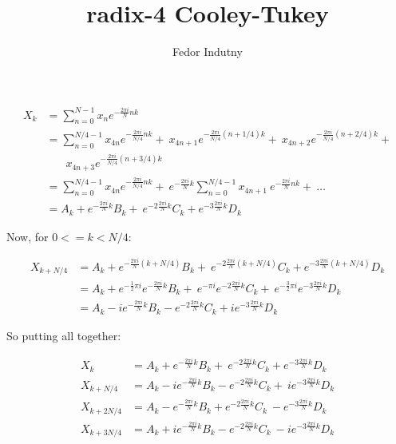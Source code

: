 \documentclass[11pt]{article}
\title{radix-4 Cooley-Tukey}
\author{Fedor Indutny}
\begin{document}
\maketitle

\begin{equation}
\begin{split}
X_k & = \sum^{N-1}_{n=0} x_n e^{-\frac{2 \pi i}{N} nk} \\
  & = \sum^{N/4 - 1}_{n=0} x_{4n} e^{-\frac{2 \pi i}{N/4} nk} + \
       x_{4n+1} e^{-\frac{2 \pi i}{N/4} (n+1/4) k} + \
       x_{4n+2} e^{-\frac{2 \pi i}{N/4} (n+2/4) k} + \\
  & \ \ \ \ \ \ \ \ x_{4n+3} e^{-\frac{2 \pi i}{N/4} (n+3/4) k} \\
  & = \sum^{N/4 - 1}_{n=0} x_{4n} e^{-\frac{2 \pi i}{N/4} nk} + \
        e^{-\frac{2 \pi i}{N}k} \sum^{N/4 - 1}_{n=0} x_{4n + 1} \
          e^{-\frac{2 \pi i}{N} nk} + \
        \dots \\
  & = A_k + e^{-\frac{2 \pi i}{N}k} B_k + \
        e^{-2 \frac{2 \pi i}{N}k} C_k + e^{-3 \frac{2 \pi i}{N}k} D_k
\end{split}
\end{equation}

Now, for $0 <= k < N/4$:

\begin{equation}
\begin{split}
X_{k + N/4} & = A_k + e^{-\frac{2 \pi i}{N}(k + N/4)} B_k + \
        e^{-2 \frac{2 \pi i}{N}(k + N/4)} C_k + e^{-3 \frac{2 \pi i}{N}(k+ N/4)} D_k \\
   & = A_k + e^{-\frac{1}{2} \pi i} e^{-\frac{2 \pi i}{N}k} B_k + \
         e^{-\pi i} e^{-2 \frac{2 \pi i}{N}k} C_k + \
         e^{-\frac{3}{2} \pi i} e^{-3 \frac{2 \pi i}{N}k} D_k \\
   & = A_k - i e^{-\frac{2 \pi i}{N}k} B_k - e^{-2 \frac{2 \pi i}{N}k} C_k + 
         i e^{-3 \frac{2 \pi i}{N}k} D_k
\end{split}
\end{equation}

So putting all together:

\begin{equation}
\begin{split}
X_k & = A_k + e^{-\frac{2 \pi i}{N}k} B_k + \
        e^{-2 \frac{2 \pi i}{N}k} C_k + e^{-3 \frac{2 \pi i}{N}k} D_k \\
X_{k + N/4} & = A_k - i e^{-\frac{2 \pi i}{N}k} B_k - e^{-2 \frac{2 \pi i}{N}k} C_k + \
         i e^{-3 \frac{2 \pi i}{N}k} D_k \\
X_{k + 2N/4} & = A_k - e^{-\frac{2 \pi i}{N}k} B_k + e^{-2 \frac{2 \pi i}{N}k} C_k \
  -e^{-3 \frac{2 \pi i}{N}k} D_k \\
X_{k + 3N/4} & = A_k + i e^{-\frac{2 \pi i}{N}k} B_k - e^{-2 \frac{2 \pi i}{N}k} C_k \
  -i e^{-3 \frac{2 \pi i}{N}k} D_k
\end{split}
\end{equation}
\end{document}
